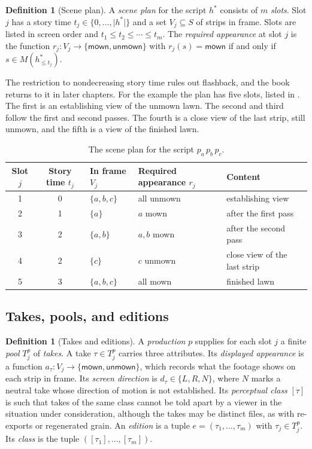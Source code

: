 \documentclass[11pt,twoside,openright]{book}
\theoremstyle{plain}
\theoremstyle{definition}
\newtheorem{definition}[theorem]{Definition}
\theoremstyle{remark}
\newcommand{\mown}{\mathsf{mown}}
\newcommand{\unmown}{\mathsf{unmown}}
\begin{document}
\begin{definition}[Scene plan]\label{def:plan}
A \emph{scene plan} for the script $h^\ast$ consists of $m$ \emph{slots}. Slot $j$ has a story time $t_j\in\{0,\dots,\lvert h^\ast\rvert\}$ and a set $V_j\subseteq S$ of strips in frame. Slots are listed in screen order and $t_1\le t_2\le\cdots\le t_m$. The \emph{required appearance} at slot $j$ is the function $r_j:V_j\to\{\mown,\unmown\}$ with $r_j(s)=\mown$ if and only if $s\in M(h^\ast_{\le t_j})$.
\end{definition}

The restriction to nondecreasing story time rules out flashback, and the book returns to it in later chapters. For the example the plan has five slots, listed in . The first is an establishing view of the unmown lawn. The second and third follow the first and second passes. The fourth is a close view of the last strip, still unmown, and the fifth is a view of the finished lawn.

\begin{table}[ht]
\centering
\begin{tabular}{@{}cclll@{}}
\toprule
Slot $j$ & Story time $t_j$ & In frame $V_j$ & Required appearance $r_j$ & Content \\
\midrule
1 & 0 & $\{a,b,c\}$ & all unmown & establishing view \\
2 & 1 & $\{a\}$ & $a$ mown & after the first pass \\
3 & 2 & $\{a,b\}$ & $a,b$ mown & after the second pass \\
4 & 2 & $\{c\}$ & $c$ unmown & close view of the last strip \\
5 & 3 & $\{a,b,c\}$ & all mown & finished lawn \\
\bottomrule
\end{tabular}
\caption{The scene plan for the script $p_a\,p_b\,p_c$.}\label{tab:plan}
\end{table}

\subsection{Takes, pools, and editions}

\begin{definition}[Takes and editions]\label{def:edition}
A \emph{production} $p$ supplies for each slot $j$ a finite \emph{pool} $T^p_j$ of \emph{takes}. A take $\tau\in T^p_j$ carries three attributes. Its \emph{displayed appearance} is a function $a_\tau:V_j\to\{\mown,\unmown\}$, which records what the footage shows on each strip in frame. Its \emph{screen direction} is $d_\tau\in\{L,R,N\}$, where $N$ marks a neutral take whose direction of motion is not established. Its \emph{perceptual class} $[\tau]$ is such that takes of the same class cannot be told apart by a viewer in the situation under consideration, although the takes may be distinct files, as with re-exports or regenerated grain. An \emph{edition} is a tuple $e=(\tau_1,\dots,\tau_m)$ with $\tau_j\in T^p_j$. Its \emph{class} is the tuple $([\tau_1],\dots,[\tau_m])$.
\end{definition}
\end{document}
